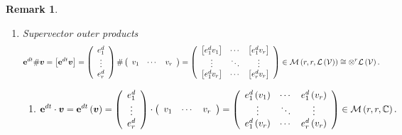 \documentclass[aps,preprint]{revtex4}%
\newtheorem{remark}[theorem]{Remark}
\begin{document}
\begin{remark}
\begin{enumerate}
\begin{enumerate}
\end{enumerate}

\item Supervector outer products%
\begin{equation}
\mathbf{e}^{dt}\#\boldsymbol{v}=\left[  \mathbf{e}^{dt}\boldsymbol{v}\right]
=\left(
\begin{array}
[c]{c}%
e_{1}^{d}\\
\vdots\\
e_{r}^{d}%
\end{array}
\right)  \#\left(
\begin{array}
[c]{ccc}%
v_{1} & \cdots & v_{r}%
\end{array}
\right)  =\left(
\begin{array}
[c]{ccc}%
\left[  e_{1}^{d}v_{1}\right]   & \cdots & \left[  e_{1}^{d}v_{r}\right]  \\
\vdots & \ddots & \vdots\\
\left[  e_{1}^{d}v_{r}\right]   & \cdots & \left[  e_{r}^{d}v_{r}\right]
\end{array}
\right)  \in\mathcal{M}\left(  r,r,\mathcal{L}\left(  \mathcal{V}\right)
\right)  \cong\otimes^{r}\mathcal{L}\left(  \mathcal{V}\right)  .
\end{equation}


\begin{enumerate}
\item
\begin{equation}
\mathbf{e}^{dt}\cdot\boldsymbol{v}=\mathbf{e}^{dt}\left(  \boldsymbol{v}%
\right)  =\left(
\begin{array}
[c]{c}%
e_{1}^{d}\\
\vdots\\
e_{r}^{d}%
\end{array}
\right)  \cdot\left(
\begin{array}
[c]{ccc}%
v_{1} & \cdots & v_{r}%
\end{array}
\right)  =\left(
\begin{array}
[c]{ccc}%
e_{1}^{d}\left(  v_{1}\right)  & \cdots & e_{1}^{d}\left(  v_{r}\right) \\
\vdots & \ddots & \vdots\\
e_{1}^{d}\left(  v_{r}\right)  & \cdots & e_{r}^{d}\left(  v_{r}\right)
\end{array}
\right)  \in\mathcal{M}\left(  r,r,\mathbb{C}\right)  .
\end{equation}



\end{enumerate}
\end{enumerate}
\end{remark}
\end{document}
